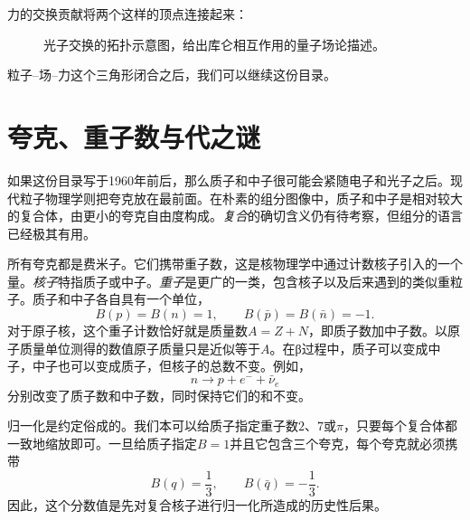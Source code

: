 力的交换贡献将两个这样的顶点连接起来：

\begin{figure}[h]
\centering
{}
\caption{光子交换的拓扑示意图，给出库仑相互作用的量子场论描述。}
\end{figure}

粒子--场--力这个三角形闭合之后，我们可以继续这份目录。

\section{夸克、重子数与代之谜}

如果这份目录写于1960年前后，那么质子和中子很可能会紧随电子和光子之后。现代粒子物理学则把夸克放在最前面。在朴素的组分图像中，质子和中子是相对较大的复合体，由更小的夸克自由度构成。\emph{复合}的确切含义仍有待考察，但组分的语言已经极其有用。

所有夸克都是费米子。它们携带重子数，这是核物理学中通过计数核子引入的一个量。\emph{核子}特指质子或中子。\emph{重子}是更广的一类，包含核子以及后来遇到的类似重粒子。质子和中子各自具有一个单位，
\begin{equation}
B(p)=B(n)=1,
\qquad
B(\bar p)=B(\bar n)=-1.
\end{equation}
对于原子核，这个重子计数恰好就是质量数\(A=Z+N\)，即质子数加中子数。以原子质量单位测得的数值原子质量只是近似等于\(A\)。在{\proseunicodefont β}过程中，质子可以变成中子，中子也可以变成质子，但核子的总数不变。例如，
\begin{equation}
n\longrightarrow p+e^-+\bar\nu_e
\end{equation}
分别改变了质子数和中子数，同时保持它们的和不变。

\begin{classroomqa}
\end{classroomqa}

归一化是约定俗成的。我们本可以给质子指定重子数\(2\)、\(7\)或\(\pi\)，只要每个复合体都一致地缩放即可。一旦给质子指定\(B=1\)并且它包含三个夸克，每个夸克就必须携带
\begin{equation}
B(q)=\frac13,
\qquad
B(\bar q)=-\frac13.
\end{equation}
因此，这个分数值是先对复合核子进行归一化所造成的历史性后果。

